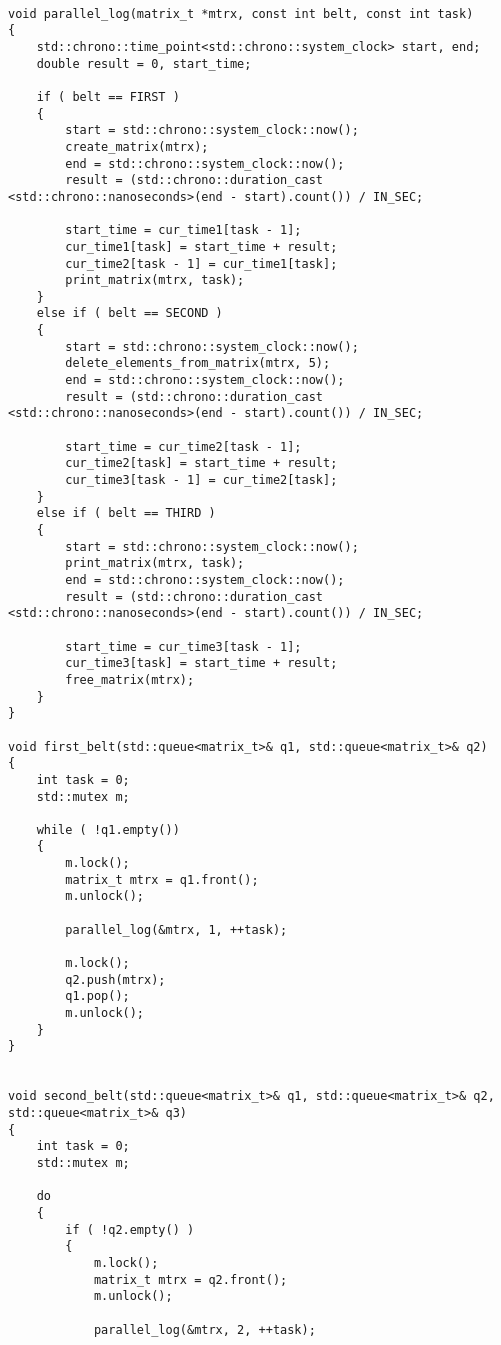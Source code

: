 \begin{center}
\captionsetup{justification=raggedright,singlelinecheck=off}
\begin{lstlisting}[label=lst:conveyor,caption=Реализация конвейерного алгоритма обработки матриц]

void parallel_log(matrix_t *mtrx, const int belt, const int task)
{
	std::chrono::time_point<std::chrono::system_clock> start, end;
	double result = 0, start_time;
	
	if ( belt == FIRST )
	{
		start = std::chrono::system_clock::now();
		create_matrix(mtrx);
		end = std::chrono::system_clock::now();
		result = (std::chrono::duration_cast <std::chrono::nanoseconds>(end - start).count()) / IN_SEC;
		
		start_time = cur_time1[task - 1];
		cur_time1[task] = start_time + result;
		cur_time2[task - 1] = cur_time1[task];
		print_matrix(mtrx, task);
	}
	else if ( belt == SECOND )
	{
		start = std::chrono::system_clock::now();
		delete_elements_from_matrix(mtrx, 5);
		end = std::chrono::system_clock::now();
		result = (std::chrono::duration_cast <std::chrono::nanoseconds>(end - start).count()) / IN_SEC;
		
		start_time = cur_time2[task - 1];
		cur_time2[task] = start_time + result;
		cur_time3[task - 1] = cur_time2[task];
	}
	else if ( belt == THIRD )
	{
		start = std::chrono::system_clock::now();
		print_matrix(mtrx, task);
		end = std::chrono::system_clock::now();
		result = (std::chrono::duration_cast <std::chrono::nanoseconds>(end - start).count()) / IN_SEC;
		
		start_time = cur_time3[task - 1];
		cur_time3[task] = start_time + result;
		free_matrix(mtrx);
	}
}

void first_belt(std::queue<matrix_t>& q1, std::queue<matrix_t>& q2)
{
	int task = 0;
	std::mutex m;
	
	while ( !q1.empty())
	{
		m.lock();
		matrix_t mtrx = q1.front();
		m.unlock();
		
		parallel_log(&mtrx, 1, ++task);
		
		m.lock();
		q2.push(mtrx);
		q1.pop();
		m.unlock();
	}
}


void second_belt(std::queue<matrix_t>& q1, std::queue<matrix_t>& q2, std::queue<matrix_t>& q3)
{
	int task = 0;
	std::mutex m;
	
	do
	{
		if ( !q2.empty() )
		{
			m.lock();
			matrix_t mtrx = q2.front();
			m.unlock();
			
			parallel_log(&mtrx, 2, ++task);
			

\end{lstlisting}
\end{center}
